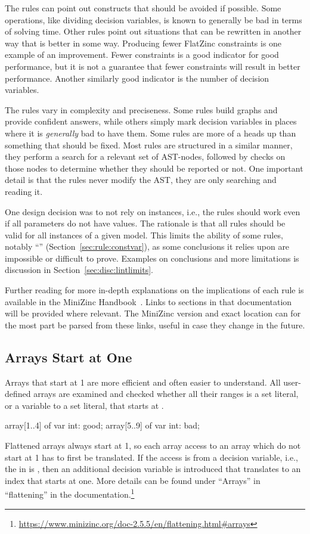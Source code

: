 \documentclass[a4paper,12pt]{article}
\newcommand{\ruleref}[1]{``\nameref{sec:rule:#1}'' (Section~\ref{sec:rule:#1})}
\begin{document}
The rules can point out constructs that should be avoided if possible. Some operations,
like dividing decision variables, is known to generally be bad in terms of solving time.
Other rules point out situations that can be rewritten in another way that is better in
some way. Producing fewer FlatZinc constraints is one example of an improvement. Fewer
constraints is a good indicator for good performance, but it is not a guarantee that fewer
constraints will result in better performance. Another similarly good indicator is the
number of decision variables.

The rules vary in complexity and preciseness. Some rules build graphs and provide
confident answers, while others simply mark decision variables in places where it is
\emph{generally} bad to have them. Some rules are more of a heads up than something that
should be fixed. Most rules are structured in a similar manner, they perform a search for
a relevant set of AST-nodes, followed by checks on those nodes to determine whether they
should be reported or not. One important detail is that the rules never modify the AST, they
are only searching and reading it.

One design decision was to not rely on instances, i.e., the rules should work even if all
parameters do not have values. The rationale is that all rules should be valid for all
instances of a given model. This limits the ability of some rules, notably
\ruleref{constvar}, as some conclusions it relies upon are impossible or difficult to prove.
Examples on conclusions and more limitations is discussion in Section~\ref{sec:disc:lintlimits}.

Further reading for more in-depth explanations on the implications of each rule is
available in the MiniZinc Handbook~\cite{mznbook}. Links to sections in that documentation
will be provided where relevant. The MiniZinc version and exact location can for the most
part be parsed from these links, useful in case they change in the future.

\subsection{Arrays Start at One}\label{sec:rule:arrayatone}
Arrays that start at 1 are more efficient and often easier to understand.
All user-defined arrays are examined and checked whether all their ranges is a set
literal, or a variable to a set literal, that starts at .
\begin{mznnobreak}
array[1..4] of var int: good;
array[5..9] of var int: bad;
\end{mznnobreak}
Flattened arrays always start at 1, so each array access to an array which do not start at
1 has to first be translated. If the access is from a decision variable, i.e., the  in  is
, then an additional decision variable is introduced that translates  to an index that
starts at one. More details can be found under ``Arrays'' in ``flattening'' in the
documentation.\footnote{\url{https://www.minizinc.org/doc-2.5.5/en/flattening.html\#arrays}}
\end{document}
